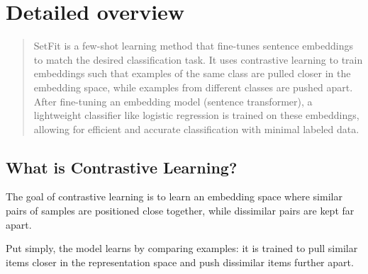\documentclass[
  letterpaper,
  DIV=11,
  numbers=noendperiod]{scrreprt}
\begin{document}
\section{Detailed overview}\label{detailed-overview}

\begin{quote}
SetFit is a few-shot learning method that fine-tunes sentence embeddings
to match the desired classification task. It uses contrastive learning
to train embeddings such that examples of the same class are pulled
closer in the embedding space, while examples from different classes are
pushed apart. After fine-tuning an embedding model (sentence
transformer), a lightweight classifier like logistic regression is
trained on these embeddings, allowing for efficient and accurate
classification with minimal labeled data.
\end{quote}

\subsection{What is Contrastive
Learning?}\label{what-is-contrastive-learning}

The goal of contrastive learning is to learn an embedding space where
similar pairs of samples are positioned close together, while dissimilar
pairs are kept far apart.

Put simply, the model learns by comparing examples: it is trained to
pull similar items closer in the representation space and push
dissimilar items further apart.
\end{document}
